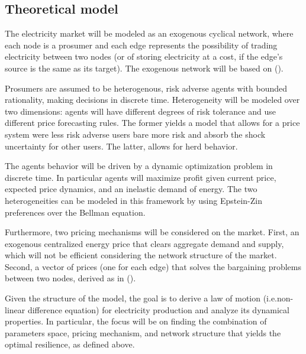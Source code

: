 \documentclass[american]{scrartcl}
\begin{document}
\subsection{Theoretical model}


The electricity market will be modeled as an exogenous cyclical network, where each node is a prosumer and each edge represents the possibility of trading electricity between two nodes (or of storing electricity at a cost, if the edge's source is the same as its target). The exogenous network will be based on \citeauthor{Brown2019} (\citeyear{Brown2019}).

Prosumers are assumed to be heterogenous, risk adverse agents with bounded rationality, making decisions in discrete time. Heterogeneity will be modeled over two dimensions: agents will have different degrees of risk tolerance and use different price forecasting rules. The former yields a model that allows for a price system were less risk adverse users bare more risk and absorb the shock uncertainty for other users. The latter, allows for herd behavior. %

The agents behavior will be driven by a dynamic optimization problem in discrete time. In particular agents will maximize profit given current price, expected price dynamics, and an inelastic demand of energy. The two heterogeneities can be modeled in this framework by using Epstein-Zin preferences over the Bellman equation.

Furthermore, two pricing mechanisms will be considered on the market. First, an exogenous centralized energy price that clears aggregate demand and supply, which will not be efficient considering the network structure of the market. Second, a vector of prices (one for each edge) that solves the bargaining problems between two nodes, derived as in \citeauthor{Bedayo2016} (\citeyear{Bedayo2016}).

Given the structure of the model, the goal is to derive a law of motion (i.e.non-linear difference equation) for electricity production and analyze its dynamical properties. In particular, the focus will be on finding the combination of parameters space, pricing mechanism, and network structure that yields the optimal resilience, as defined above.
\end{document}
